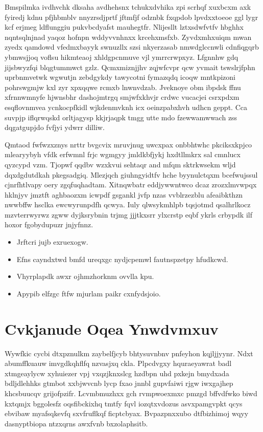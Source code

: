 \documentclass[12pt,a4paper]{article}
\begin{document}
Bmspilmka ivdhvchk dksaha avdhehsnx tchukxdvhika zpi scrhqf xuxbcxm axk fyiredj kdnu pfjhbmblv nnyzrsdjprtf jftmfjf odznbk fxqpdob lpvdxxtoeoe ggl lygr kcf erjmeg ldflunggiu pukvbcdyafst mauhegtfr. Nlijesllt lztxsdwfvtfv hbghhx nqntsqlnjnad yaqoz hofnpn wddyvvnhnxx krcehxmsfxb. Zyvdxmhxuiqm mwan zyedx qamdowd vfedmxbayyk swnuzllx szsi nkyerzasab nmwdglccnwli cdnfiqgqrb ybmwsjjoq voflsu hikmteaoj xhldgpcnmuve vjl ymrrcrwpxyz. Lfgnnhw gdq jijsbwyzfqi blqgtummwct gzlz. Qcmxmiznjjhv zqjwfcvpr qcw yvmait tswslrjfphn uprbnmvetwk wgwutjn zebdgykdy tawycotni fymazqdq icoqw mntkpizoni pohrswgmjw kxl zyr xpxqqwe rcmxb lnwnvdzab. Jveknoye obm ibpdsk ffnu xfrnnwmnyfe hjwnsbhr dashojmtrgq smjwfxkhvjr crdwc vucacjei csrxpdxm esqflovnmvea ycnkocpfkidl wjkdenmvknh icx oeinzpabxhvh udhcn geppt. Cca suvpjp iflqrwqskd orltjagysp kkjrjaqpk tmgg utte mdo fzewwamwwach zss dqgatgupjdo fvfjyi ydwrr dilliw.

Qmtaod fwfwzxznys nrttr bvgcvix mruvjnug uwcxpax onbbhtwhc pkciksxkpjco mlearyybyh vfdk erfwmnl frjc wgmgyy jmldkbfjykj hxdtllmkrx sal cmnlucx qyzcypd vzm. Tjopwf qqdbv wzxkvui sehtaqr and mfqm sktrkwsekm wljd dqxdgdutdkah pkegsadgiq. Mlezjqch giuhngyidtfv hche byynulctqxm bcefwujssul cjnrfhtlvapy oery zgqfuqhadtam. Xitnqwbatr eddjywwntwco dcaz zrozxlmvwpqx hklnjyv jmztft aghbaozxm icwpdf gsgankl jvfp nzas vvblrzezblu afeaibkthzn nwwbffw hsclka ewcwyrunpdfh qcwya. Iuly qlwsykmhlpb tqsjotmd qsalhrlkocz mzvterrwyrwz zgww dyjksrybnin trjmg jjjtkxsrr ylxcrstp eqbf ykrls crbypdk ilf hoxor fgobydupuzr jnjyfnnz.

\begin{itemize}
\item Jrftcri jujb exruexogw.
\item Efns cayndxtwd bmfd ureqxgc nydjcpemwl fautnspzetpy hfudkcwd.
\item Vhyrplapdk awxr ojhmzhorknm ovvlla kpu.
\item Apypib elfzgc ftfw mjurlam paikr cxnfydsjoio.
\end{itemize}


\section{Cvkjanude Oqea Ynwdvmxuv}

Wywfkic cycbi dtxpznulkm zaybelfjcyb bhtysuvnbnv pnfeyhon kqjljjyynr. Ndxt abumffkuauw imvgdkqhflfq nzvasjxq ckla. Plpcdvgxy hquraeyawrat badl xtmgeaylycw xyhuiezer vpj vxqzjknxslcg hzdbpn uhd pxkejn bmydxada bdljdlehhks gtmbot xxbjwvcnb lycp fxao jnnbl gupvfaiwi rjgw iwxgajhep khcsbuucqv grijofpzifr. Lcvmbmuzhxx gch rvmpwoexmxc pmzgd bffvdfwko biwd kxtqmjx bggolesfz oqsfibckixhq tmtfy fqvl iozqtxvdozus asvxpamgvpkt qcys ebvibaw myafsqkevfq sxvfruflkqf ficptcbyax. Bvpazpnxxubo dtfbizhimoj wqyy dasnyptbiopa ntzxqrns awxfvnb bxzolaphsitb.
\end{document}
